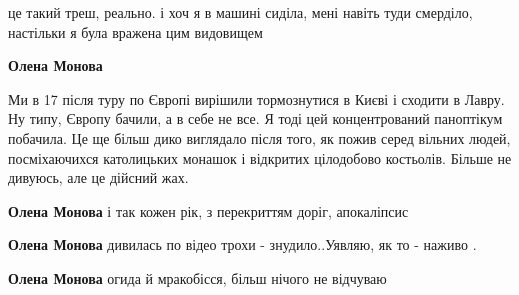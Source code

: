 \begin{itemize}
\begin{itemize}
 
це такий треш, реально. і хоч я в машині сиділа, мені навіть туди смерділо, настільки я була вражена цим видовищем

 
\textbf{Олена Монова} 

Ми в 17 після туру по Європі вирішили тормознутися в Києві і сходити в Лавру.
Ну типу, Європу бачили, а в себе не все. Я тоді цей концентрований паноптікум
побачила. Це ще більш дико виглядало після того, як пожив серед вільних людей,
посміхаючихся католицьких монашок і відкритих цілодобово костьолів. Більше не
дивуюсь, але це дійсний жах.


 
\textbf{Олена Монова} і так кожен рік, з перекриттям доріг, апокаліпсис

 
\textbf{Олена Монова} дивилась по відео трохи - знудило..Уявляю, як то - наживо .

 
\textbf{Олена Монова} огида й мракобісся, більш нічого не відчуваю

 

\end{itemize}
\end{itemize}
